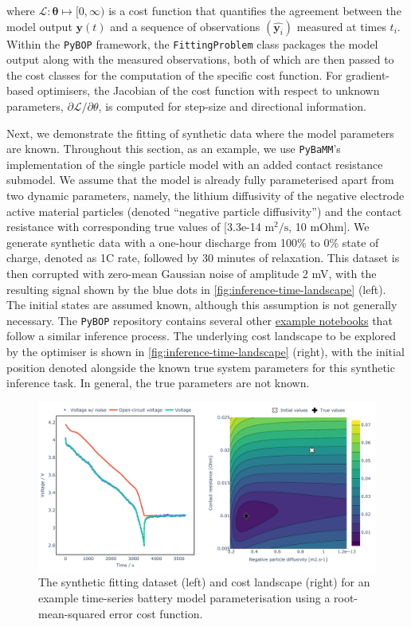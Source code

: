 \documentclass[
]{article}
\begin{document}
where \(\mathcal{L} : \mathbf{\theta} \mapsto [0,\infty)\) is a cost
function that quantifies the agreement between the model output
\(\mathbf{y}(t)\) and a sequence of observations
\((\hat{\mathbf{y}_i})\) measured at times \(t_i\). Within the
\texttt{PyBOP} framework, the \texttt{FittingProblem} class packages the
model output along with the measured observations, both of which are
then passed to the cost classes for the computation of the specific cost
function. For gradient-based optimisers, the Jacobian of the cost
function with respect to unknown parameters,
\(\partial \mathcal{L} / \partial \theta\), is computed for step-size
and directional information.

Next, we demonstrate the fitting of synthetic data where the model
parameters are known. Throughout this section, as an example, we use
\texttt{PyBaMM}'s implementation of the single particle model with an
added contact resistance submodel. We assume that the model is already
fully parameterised apart from two dynamic parameters, namely, the
lithium diffusivity of the negative electrode active material particles
(denoted ``negative particle diffusivity'') and the contact resistance
with corresponding true values of {[}3.3e-14 \(\text{m}^2/\text{s}\), 10
mOhm{]}. We generate synthetic data with a one-hour discharge from 100\%
to 0\% state of charge, denoted as 1C rate, followed by 30 minutes of
relaxation. This dataset is then corrupted with zero-mean Gaussian noise
of amplitude 2 mV, with the resulting signal shown by the blue dots in
\autoref{fig:inference-time-landscape} (left). The initial states are
assumed known, although this assumption is not generally necessary. The
\texttt{PyBOP} repository contains several other
\href{https://github.com/pybop-team/PyBOP/tree/develop/examples/notebooks}{example
notebooks} that follow a similar inference process. The underlying cost
landscape to be explored by the optimiser is shown in
\autoref{fig:inference-time-landscape} (right), with the initial
position denoted alongside the known true system parameters for this
synthetic inference task. In general, the true parameters are not known.

\begin{figure}
\centering
\includegraphics[width=1\textwidth,height=\textheight]{figures/joss/sim-landscape.pdf}
\caption{The synthetic fitting dataset (left) and cost landscape (right)
for an example time-series battery model parameterisation using a
root-mean-squared error cost function.
\label{fig:inference-time-landscape}}
\end{figure}
\end{document}
